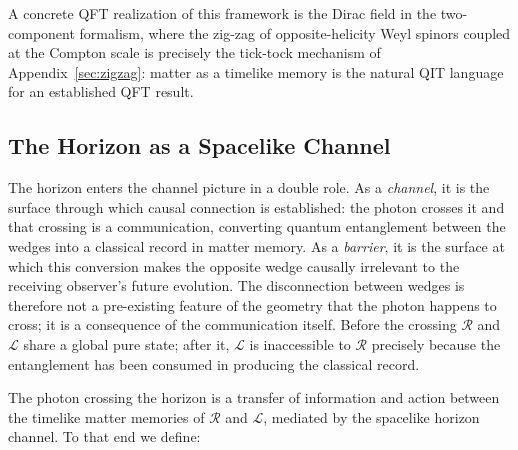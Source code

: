 \documentclass[12pt,a4paper]{article}
\begin{document}
A concrete QFT realization of this framework is the 
Dirac field in the two-component formalism, where the 
zig-zag of opposite-helicity Weyl spinors coupled at 
the Compton scale is precisely the tick-tock mechanism 
of Appendix~\ref{sec:zigzag}: matter as a timelike 
memory is the natural 
QIT language for an established QFT result.

\subsection{The Horizon as a Spacelike Channel}
\label{sec:horizon_channel}

The horizon enters the channel picture in a double role. 
As a \emph{channel}, it is the surface through which 
causal connection is established: the photon crosses it 
and that crossing is a communication, converting 
quantum entanglement between the wedges into a classical 
record in matter memory. As a \emph{barrier}, it is the 
surface at which this conversion makes the opposite wedge 
causally irrelevant to the receiving observer's future 
evolution. The disconnection between wedges is therefore 
not a pre-existing feature of the geometry that the 
photon happens to cross; it is a consequence of the 
communication itself. Before the crossing $\mathcal{R}$ and 
$\mathcal{L}$ share a global pure state; after it, 
$\mathcal{L}$ is inaccessible to $\mathcal{R}$ precisely 
because the entanglement has been consumed in producing 
the classical record.

The photon crossing the horizon is a transfer of information and
action between the timelike matter memories of $\mathcal{R}$ and 
$\mathcal{L}$, mediated by the spacelike horizon channel.
To that end we define:
\end{document}
